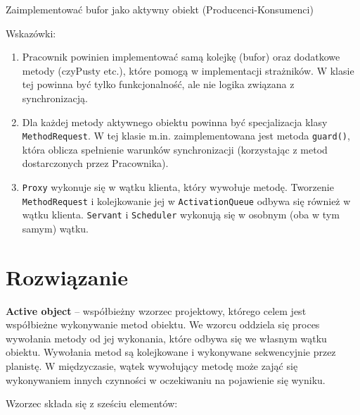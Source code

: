 \documentclass[11pt]{article}
\providecommand{\tightlist}{%
      \setlength{\itemsep}{0pt}\setlength{\parskip}{0pt}}
\begin{document}
Zaimplementować bufor jako aktywny obiekt (Producenci-Konsumenci)

Wskazówki:

\begin{enumerate}
\def\labelenumi{\arabic{enumi}.}
\tightlist
\item
  Pracownik powinien implementować samą kolejkę (bufor) oraz dodatkowe
  metody (czyPusty etc.), które pomogą w implementacji strażników. W
  klasie tej powinna być tylko funkcjonalność, ale nie logika związana z
  synchronizacją.
\item
  Dla każdej metody aktywnego obiektu powinna być specjalizacja klasy
  \texttt{MethodRequest}. W tej klasie m.in. zaimplementowana jest
  metoda \texttt{guard()}, która oblicza spełnienie warunków
  synchronizacji (korzystając z metod dostarczonych przez Pracownika).
\item
  \texttt{Proxy} wykonuje się w wątku klienta, który wywołuje metodę.
  Tworzenie \texttt{MethodRequest} i kolejkowanie jej w
  \texttt{ActivationQueue} odbywa się również w wątku klienta.
  \texttt{Servant} i \texttt{Scheduler} wykonują się w osobnym (oba w
  tym samym) wątku.
\end{enumerate}

    \hypertarget{rozwiux105zanie}{%
\section{Rozwiązanie}\label{rozwiux105zanie}}

\textbf{Active object} -- współbieżny wzorzec projektowy, którego celem
jest współbieżne wykonywanie metod obiektu. We wzorcu oddziela się
proces wywołania metody od jej wykonania, które odbywa się we własnym
wątku obiektu. Wywołania metod są kolejkowane i wykonywane sekwencyjnie
przez planistę. W międzyczasie, wątek wywołujący metodę może zająć się
wykonywaniem innych czynności w oczekiwaniu na pojawienie się wyniku.

    Wzorzec składa się z sześciu elementów:
\end{document}
